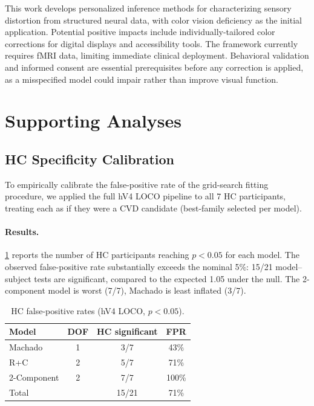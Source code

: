 \documentclass{article}
\begin{document}
This work develops personalized inference methods for characterizing sensory distortion from structured neural data, with color vision deficiency as the initial application.
Potential positive impacts include individually-tailored color corrections for digital displays and accessibility tools.
The framework currently requires fMRI data, limiting immediate clinical deployment.
Behavioral validation and informed consent are essential prerequisites before any correction is applied, as a misspecified model could impair rather than improve visual function.




\newpage
\appendix
\onecolumn

\section{Supporting Analyses}
\label{app:supporting}

\subsection{HC Specificity Calibration}
\label{app:hc_specificity}

To empirically calibrate the false-positive rate of the grid-search fitting procedure, we applied the full hV4 LOCO pipeline to all 7 HC participants, treating each as if they were a CVD candidate (best-family selected per model).

\paragraph{Results.}
\cref{tab:hc_fpr} reports the number of HC participants reaching $p < 0.05$ for each model.
The observed false-positive rate substantially exceeds the nominal 5\%: 15/21 model--subject tests are significant, compared to the expected 1.05 under the null.
The 2-component model is worst (7/7), Machado is least inflated (3/7).

\begin{table}[h]
  \caption{HC false-positive rates (hV4 LOCO, $p < 0.05$).}
  \label{tab:hc_fpr}
  \begin{center}
    \begin{small}
      \begin{tabular}{lccc}
        \toprule
        Model & DOF & HC significant & FPR \\
        \midrule
        Machado & 1 & 3/7 & 43\% \\
        R+C & 2 & 5/7 & 71\% \\
        2-Component & 2 & 7/7 & 100\% \\
        \midrule
        Total & & 15/21 & 71\% \\
        \bottomrule
      \end{tabular}
    \end{small}
  \end{center}
\end{table}
\end{document}

